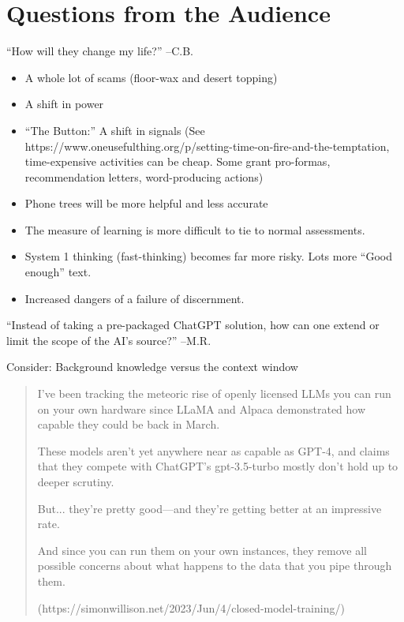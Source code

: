 \documentclass[aspectratio=169]{beamer}
\begin{document}
\section{Questions from the Audience}
\begin{frame}{``How will they change my life?'' --C.B.}
\begin{itemize}
    \item A whole lot of scams (floor-wax and desert topping)
    \item A shift in power
    \item ``The Button:'' A shift in signals (See https://www.oneusefulthing.org/p/setting-time-on-fire-and-the-temptation, time-expensive activities can be cheap. Some grant pro-formas, recommendation letters, word-producing actions)
    \item Phone trees will be more helpful and less accurate
    \item The measure of learning is more difficult to tie to normal assessments.
    \item System 1 thinking (fast-thinking) becomes far more risky. Lots more ``Good enough'' text. 
    \item Increased dangers of a failure of discernment.
\end{itemize}
    
\end{frame}

\begin{frame}{``Instead of taking a pre-packaged ChatGPT solution, how can one extend or limit the scope of the AI's source?'' --M.R.
}

Consider: Background knowledge versus the context window        

\begin{quote}
I’ve been tracking the meteoric rise of openly licensed LLMs you can run on your own hardware since LLaMA and Alpaca demonstrated how capable they could be back in March.

These models aren’t yet anywhere near as capable as GPT-4, and claims that they compete with ChatGPT’s gpt-3.5-turbo mostly don’t hold up to deeper scrutiny.

But... they’re pretty good—and they’re getting better at an impressive rate.

And since you can run them on your own instances, they remove all possible concerns about what happens to the data that you pipe through them.

(https://simonwillison.net/2023/Jun/4/closed-model-training/)
        \end{quote}
\end{frame}
\end{document}
